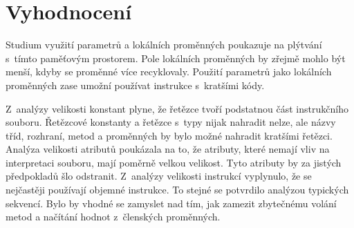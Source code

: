 \section{Vyhodnocení}\label{AnalysisSummary}

Studium využití parametrů a lokálních proměnných poukazuje na plýtvání s~tímto paměťovým prostorem. Pole lokálních proměnných by zřejmě mohlo být menší, kdyby se proměnné více recyklovaly. Použití parametrů jako lokálních proměnných zase umožní používat instrukce s~kratšími kódy.

Z~analýzy velikosti konstant plyne, že řetězce tvoří podstatnou část instrukčního souboru. Řetězcové konstanty a řetězce s~typy nijak nahradit nelze, ale názvy tříd, rozhraní, metod a proměnných by bylo možné nahradit kratšími řetězci. 
Analýza velikosti atributů poukázala na to, že atributy, které nemají vliv na interpretaci souboru, mají poměrně velkou velikost. Tyto atributy by za jistých předpokladů šlo odstranit.
Z~analýzy velikosti instrukcí vyplynulo, že se nejčastěji používají objemné instrukce. To stejné se potvrdilo analýzou typických sekvencí. Bylo by vhodné se zamyslet nad tím, jak zamezit zbytečnému volání metod a načítání hodnot z~členských proměnných. 




